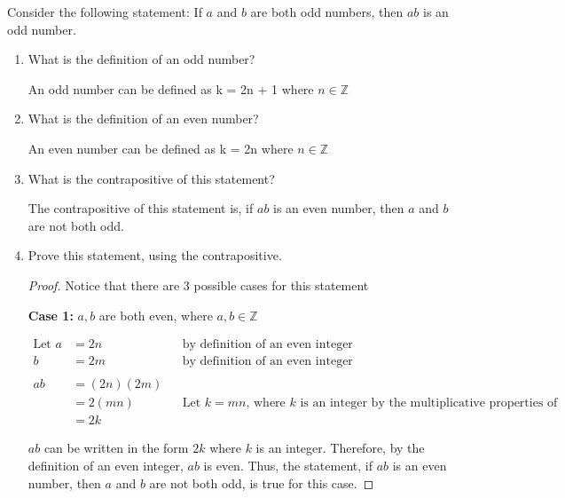 \documentclass{article}
\begin{document}
\nextprob
Consider the following statement: If $a$ and $b$ are both odd numbers, then $ab$ is
an odd number.
\begin{enumerate}
    \item What is the definition of an odd number?
    
    An odd number can be defined as k = 2n + 1 where $n \in \mathbb{Z}$

    \item What is the definition of an even number?
    
    An even number can be defined as k = 2n where $n \in \mathbb{Z}$

    \item What is the contrapositive of this statement?
    
    The contrapositive of this statement is, if $ab$ is an even number, then $a$ and $b$ are not both odd.

    \item Prove this statement, using the contrapositive.
    
    

    
    \begin{proof} Notice that there are 3 possible cases for this statement
        
        \vspace{0.5cm}
        
        \leftskip 1cm
        \textbf{Case 1:} $a,b$ are both even, where $a,b \in \mathbb{Z}$
        
        \begin{align*}
            \text{Let } a &= 2n &&\text{by definition of an even integer} \\
             b &= 2m &&\text{by definition of an even integer} \\
             \\
             ab &= (2n)(2m) \\
             &= 2(mn) &&\text{Let $k = mn$, where $k$ is an integer by the multiplicative properties of integers} \\
             &=2k
        \end{align*}

        $ab$ can be written in the form $2k$ where $k$ is an integer. Therefore, by the definition of an even integer, $ab$ is even. Thus, the statement, if $ab$ is an even number, then $a$ and $b$ are not both odd, is true for this case.
        \vspace{0.5cm}


\end{proof}
\end{enumerate}
\end{document}
